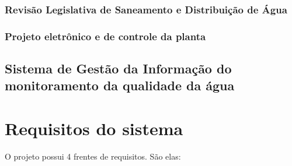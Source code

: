       \subsubsection{Revisão Legislativa de Saneamento e Distribuição de Água}
      	
        
      \subsubsection{Projeto eletrônico e de controle da planta}
        
        
    
    \pagebreak  
    \subsection{Sistema de Gestão da Informação do monitoramento da qualidade da água}
	
	
      
  \section{Requisitos do sistema}
  
      O projeto possui 4 frentes de requisitos. São elas:
      
